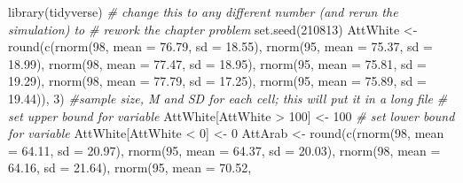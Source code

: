 \documentclass[
  11pt,
]{book}
\newenvironment{Shaded}{\begin{snugshade}}{\end{snugshade}}
\newcommand{\AttributeTok}[1]{\textcolor[rgb]{0.77,0.63,0.00}{#1}}
\newcommand{\CommentTok}[1]{\textcolor[rgb]{0.56,0.35,0.01}{\textit{#1}}}
\newcommand{\DecValTok}[1]{\textcolor[rgb]{0.00,0.00,0.81}{#1}}
\newcommand{\FloatTok}[1]{\textcolor[rgb]{0.00,0.00,0.81}{#1}}
\newcommand{\FunctionTok}[1]{\textcolor[rgb]{0.00,0.00,0.00}{#1}}
\newcommand{\NormalTok}[1]{#1}
\newcommand{\OtherTok}[1]{\textcolor[rgb]{0.56,0.35,0.01}{#1}}
\newcommand{\SpecialCharTok}[1]{\textcolor[rgb]{0.00,0.00,0.00}{#1}}
\begin{document}
\begin{Shaded}
\begin{Highlighting}[]
\FunctionTok{library}\NormalTok{(tidyverse)}
\CommentTok{\# change this to any different number (and rerun the simulation) to}
\CommentTok{\# rework the chapter problem}
\FunctionTok{set.seed}\NormalTok{(}\DecValTok{210813}\NormalTok{)}
\NormalTok{AttWhite }\OtherTok{\textless{}{-}} \FunctionTok{round}\NormalTok{(}\FunctionTok{c}\NormalTok{(}\FunctionTok{rnorm}\NormalTok{(}\DecValTok{98}\NormalTok{, }\AttributeTok{mean =} \FloatTok{76.79}\NormalTok{, }\AttributeTok{sd =} \FloatTok{18.55}\NormalTok{), }\FunctionTok{rnorm}\NormalTok{(}\DecValTok{95}\NormalTok{, }\AttributeTok{mean =} \FloatTok{75.37}\NormalTok{,}
    \AttributeTok{sd =} \FloatTok{18.99}\NormalTok{), }\FunctionTok{rnorm}\NormalTok{(}\DecValTok{98}\NormalTok{, }\AttributeTok{mean =} \FloatTok{77.47}\NormalTok{, }\AttributeTok{sd =} \FloatTok{18.95}\NormalTok{), }\FunctionTok{rnorm}\NormalTok{(}\DecValTok{95}\NormalTok{, }\AttributeTok{mean =} \FloatTok{75.81}\NormalTok{,}
    \AttributeTok{sd =} \FloatTok{19.29}\NormalTok{), }\FunctionTok{rnorm}\NormalTok{(}\DecValTok{98}\NormalTok{, }\AttributeTok{mean =} \FloatTok{77.79}\NormalTok{, }\AttributeTok{sd =} \FloatTok{17.25}\NormalTok{), }\FunctionTok{rnorm}\NormalTok{(}\DecValTok{95}\NormalTok{, }\AttributeTok{mean =} \FloatTok{75.89}\NormalTok{,}
    \AttributeTok{sd =} \FloatTok{19.44}\NormalTok{)), }\DecValTok{3}\NormalTok{)  }\CommentTok{\#sample size, M and SD for each cell; this will put it in a long file}
\CommentTok{\# set upper bound for variable}
\NormalTok{AttWhite[AttWhite }\SpecialCharTok{\textgreater{}} \DecValTok{100}\NormalTok{] }\OtherTok{\textless{}{-}} \DecValTok{100}
\CommentTok{\# set lower bound for variable}
\NormalTok{AttWhite[AttWhite }\SpecialCharTok{\textless{}} \DecValTok{0}\NormalTok{] }\OtherTok{\textless{}{-}} \DecValTok{0}
\NormalTok{AttArab }\OtherTok{\textless{}{-}} \FunctionTok{round}\NormalTok{(}\FunctionTok{c}\NormalTok{(}\FunctionTok{rnorm}\NormalTok{(}\DecValTok{98}\NormalTok{, }\AttributeTok{mean =} \FloatTok{64.11}\NormalTok{, }\AttributeTok{sd =} \FloatTok{20.97}\NormalTok{), }\FunctionTok{rnorm}\NormalTok{(}\DecValTok{95}\NormalTok{, }\AttributeTok{mean =} \FloatTok{64.37}\NormalTok{,}
    \AttributeTok{sd =} \FloatTok{20.03}\NormalTok{), }\FunctionTok{rnorm}\NormalTok{(}\DecValTok{98}\NormalTok{, }\AttributeTok{mean =} \FloatTok{64.16}\NormalTok{, }\AttributeTok{sd =} \FloatTok{21.64}\NormalTok{), }\FunctionTok{rnorm}\NormalTok{(}\DecValTok{95}\NormalTok{, }\AttributeTok{mean =} \FloatTok{70.52}\NormalTok{,}

\end{Highlighting}
\end{Shaded}
\end{document}
